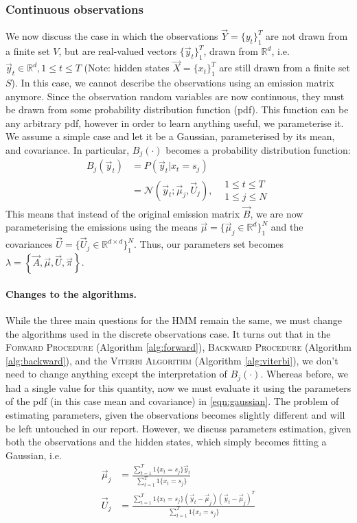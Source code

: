 \subsubsection{Continuous observations}
	We now discuss the case in which the observations $\vec Y = \{y_t\}_1^T$ are not drawn from a finite set $V$, but are real-valued vectors $\{\vec y_t\}_1^T$, drawn from $\mathbb{R}^d$, i.e. $\vec y_t \in \mathbb{R}^d, 1 \leq t \leq T$ (Note: hidden states $\vec X = \{x_t\}_1^T$ are still drawn from a finite set $S$). In this case, we cannot describe the observations using an emission matrix anymore. Since the observation random variables are now continuous, they must be drawn from some probability distribution function (pdf). This function can be any arbitrary pdf, however in order to learn anything useful, we parameterise it. We assume a simple case and let it be a Gaussian, parameterised by its mean, and covariance. In particular, $B_j(\cdot)$ becomes a probability distribution function:
	\begin{align}
		B_j(\vec y_t) 	& = P\left( \vec y_t | x_t = s_j\right) \nonumber\\
					& = \mathcal{N}(\vec y_t; \vec\mu_j, \vec U_j), \label{eqn:gaussian}&
		\begin{array}{lr}
			1 \leq t \leq T\\
			1 \leq j \leq N
		\end{array}
	\end{align}
	This means that instead of the original emission matrix $\vec B$, we are now parameterising the emissions using the means $\vec\mu = \{\vec\mu_j \in \mathbb{R}^d\}_1^N$ and the covariances $\vec U = \{\vec U_j \in \mathbb{R}^{d\times d}\}_1^N$. Thus, our parameters set becomes $\lambda = \left\{ \vec A, \vec \mu, \vec U, \vec \pi\right\}$.

	\paragraph{Changes to the algorithms.}
	While the three main questions for the HMM remain the same, we must change the algorithms used in the discrete observations case. It turns out that in the \textsc{Forward Procedure} (Algorithm \ref{alg:forward}), \textsc{Backward Procedure} (Algorithm \ref{alg:backward}), and the \textsc{Viterbi Algorithm} (Algorithm \ref{alg:viterbi}), we don't need to change anything except the interpretation of $B_j(\cdot)$. Whereas before, we had a single value for this quantity, now we must evaluate it using the parameters of the pdf (in this case mean and covariance) in \eqref{eqn:gaussian}. The problem of estimating parameters, given the observations becomes slightly different and will be left untouched in our report. However, we discuss parameters estimation, given both the observations and the hidden states, which simply becomes fitting a Gaussian, i.e.
	\begin{align}
		\vec\mu_j & = \frac{\sum_{t = 1}^T 1\{x_t = s_j\} \vec y_t}{\sum_{t = 1}^T 1\{x_t = s_j\}} \\
		\vec U_j & = \frac{\sum_{t = 1}^T 1\{x_t = s_j\} (\vec y_t - \vec\mu_j)(\vec y_t - \vec\mu_j)^T}{\sum_{t = 1}^T 1\{x_t = s_j\}}
	\end{align}

